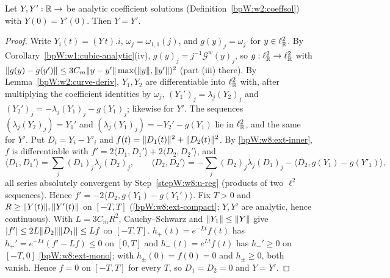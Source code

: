 \begin{lemma}\label{bpW:w8:unique}
Let $Y,Y':\mathbb{R}\to$  be analytic coefficient solutions (Definition~\ref{bpW:w2:coeffsol}) with $Y(0)=Y'(0)$. Then $Y=Y'$.
\end{lemma}
\begin{proof}
Write $Y_i(t)=(Y\,t).i$, $\omega_j=\omega_{1,1}(j)$, and $g(y)_j=\omega_j\,$ for $y\in\ell^2_{\mathbb{R}}$.
\label{stepW:w8:u-raw} By Corollary~\ref{bpW:w1:cubic-analytic}(iv), $g(y)_j=j^{-1}\mathcal G^w(y)_j$, so
$g:\ell^2_{\mathbb{R}}\to\ell^2_{\mathbb{R}}$ with $\lVert g(y)-g(y')\rVert\le3C_m\lVert y-y'\rVert\max(\lVert y\rVert,\lVert y'\rVert)^2$ (part (iii) there). By
Lemma~\ref{bpW:w2:curve-deriv}, $Y_1,Y_2$ are differentiable into $\ell^2_{\mathbb{R}}$ with, after multiplying the coefficient identities by
$\omega_j$, $(Y_1')_j=\lambda_j(Y_2)_j$ and $(Y_2')_j=-\lambda_j(Y_1)_j-g(Y_1)_j$; likewise for $Y'$.
\label{stepW:w8:u-reg} The sequences $(\lambda_j(Y_2)_j)=Y_1'$ and $(\lambda_j(Y_1)_j)=-Y_2'-g(Y_1)$ lie in $\ell^2_{\mathbb{R}}$, and the same for $Y'$.
\label{stepW:w8:u-energy} Put $D_i=Y_i-Y'_i$ and $f(t)=\lVert D_1(t)\rVert^2+\lVert D_2(t)\rVert^2$. By \ref{bpW:w8:ext-inner}, $f$ is
differentiable with $f'=2\langle D_1,D_1'\rangle+2\langle D_2,D_2'\rangle$, and
\[\langle D_1,D_1'\rangle=\sum_j(D_1)_j\lambda_j(D_2)_j,\qquad
\langle D_2,D_2'\rangle=-\sum_j(D_2)_j\lambda_j(D_1)_j-\langle D_2,g(Y_1)-g(Y'_1)\rangle,\]
all series absolutely convergent by Step~\ref{stepW:w8:u-reg} (products of two $\ell^2$ sequences). Hence
$f'=-2\langle D_2,g(Y_1)-g(Y_1')\rangle$.
\label{stepW:w8:u-ineq} Fix $T>0$ and $R\ge\lVert Y(t)\rVert,\lVert Y'(t)\rVert$ on $[-T,T]$
(\ref{bpW:w8:ext-compact}; $Y,Y'$ are analytic, hence continuous). With $L=3C_mR^2$, Cauchy--Schwarz and $\lVert Y_1\rVert\le\lVert Y\rVert$ give
$\lvert f'\rvert\le2L\lVert D_2\rVert\lVert D_1\rVert\le Lf$ on $[-T,T]$.
\label{stepW:w8:u-gron} $h_+(t)=e^{-Lt}f(t)$ has $h_+'=e^{-Lt}(f'-Lf)\le0$ on $[0,T]$ and $h_-(t)=e^{Lt}f(t)$ has
$h_-'\ge0$ on $[-T,0]$ \ref{bpW:w8:ext-mono}; with $h_\pm(0)=f(0)=0$ and $h_\pm\ge0$, both vanish. Hence $f=0$ on $[-T,T]$ for every $T$,
so $D_1=D_2=0$ and $Y=Y'$.
\end{proof}

